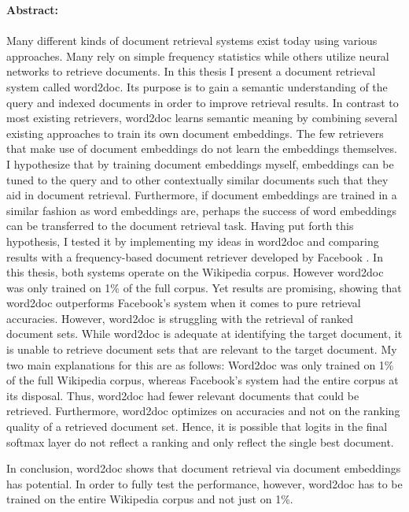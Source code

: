 \documentclass[english, ngerman]{KITreprt}
\begin{document}
\thispagestyle{empty}
\newpage
\vspace*{\fill}
\noindent
\textbf{Abstract:}\\
\\
\noindent
Many different kinds of document retrieval systems exist today using various approaches. Many rely on simple frequency
statistics while others utilize neural networks to retrieve documents. In this thesis I present a document retrieval system called
word2doc. Its purpose is to gain a semantic understanding of the query and indexed documents in order to improve retrieval
results. In contrast to most existing retrievers, word2doc learns semantic meaning by combining several existing approaches
to train its own document embeddings. The few retrievers that make use of document embeddings do not learn the embeddings
themselves. I hypothesize that by training document embeddings myself, embeddings can be tuned to the query and to other
contextually similar documents such that they aid in document retrieval. Furthermore, if document embeddings are trained in a similar
fashion as word embeddings are, perhaps the success of word embeddings can be transferred to the document retrieval task. Having
put forth this hypothesis, I tested it by implementing my ideas in word2doc and comparing results with a frequency-based document
retriever developed by Facebook \citep{drqa}. In this thesis, both systems operate on the Wikipedia corpus. However word2doc was only
trained on 1\% of the full corpus. Yet results are promising, showing that word2doc outperforms Facebook's system when it
comes to pure retrieval accuracies. However, word2doc is struggling with the retrieval of ranked document sets. While word2doc
is adequate at identifying the target document, it is unable to retrieve document sets that are relevant to the target document.
My two main explanations for this are as follows: Word2doc was only trained on 1\% of the full Wikipedia corpus, whereas Facebook's
system had the entire corpus at its disposal. Thus, word2doc had fewer relevant documents that could be retrieved. Furthermore,
word2doc optimizes on accuracies and not on the ranking quality of a retrieved document set. Hence, it is possible that
logits in the final softmax layer do not reflect a ranking and only reflect the single best document.

In conclusion, word2doc shows that document retrieval via document embeddings has potential. In order to fully test the
performance, however, word2doc has to be trained on the entire Wikipedia corpus and not just on 1\%.
\end{document}
